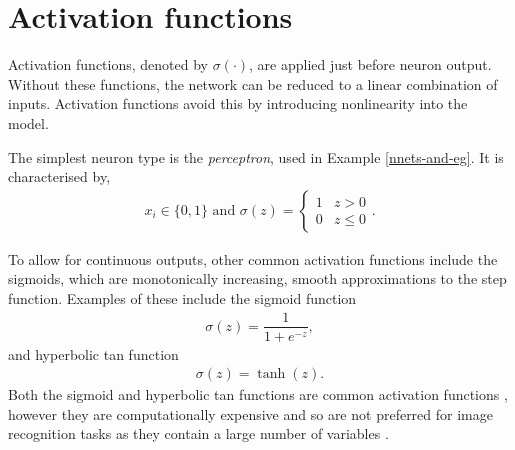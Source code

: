 \pagebreak
\section{Activation functions}\label{nnets-act}

Activation functions, denoted by $\sigma(\cdot)$, are applied just before neuron output. Without these functions, the network can be reduced to a linear combination of inputs. Activation functions avoid this by introducing nonlinearity into the model.

The simplest neuron type is the \textit{perceptron}, used in Example \ref{nnets-and-eg}. It is characterised by,
\begin{align}
	x_i \in \{0,1\} \text{ and } \sigma(z) = \begin{cases}
		1 & z > 0 \\
		0 & z \le 0
	\end{cases}.
\end{align}

To allow for continuous outputs, other common activation functions include the sigmoids, which are monotonically increasing, smooth approximations to the step function. Examples of these include the sigmoid function
\begin{align}
	\sigma(z) = \dfrac{1}{1+e^{-z}},
\end{align}
and hyperbolic tan function
\begin{align}
	\sigma(z) = \tanh(z).
\end{align}
Both the sigmoid and hyperbolic tan functions are common activation functions \cite{Goodfellow-et-al-2016}, however they are computationally expensive and so are not preferred for image recognition tasks as they contain a large number of variables \cite{LeCun2012, Nielson2015}.

